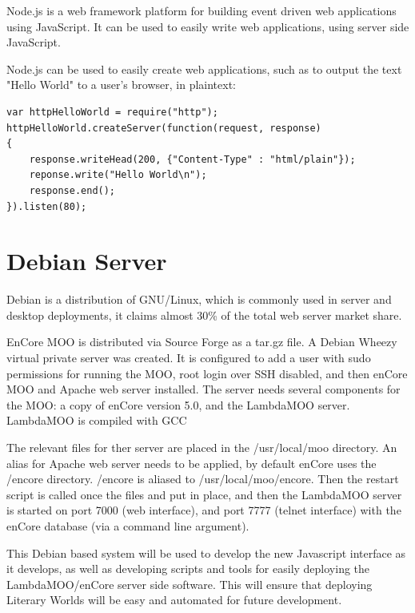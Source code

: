 \documentclass[12pt, letterpaper]{report}
\begin{document}
\par
Node.js is a web framework platform for building event driven web applications using JavaScript. It can be used to easily write web applications, using server side JavaScript.
	
\par
Node.js can be used to easily create web applications, such as to output the text "Hello World" to a user's browser, in plaintext:

\begin{lstlisting}
var httpHelloWorld = require("http");
httpHelloWorld.createServer(function(request, response)
{
    response.writeHead(200, {"Content-Type" : "html/plain"});
    reponse.write("Hello World\n");
    response.end();
}).listen(80);
\end{lstlisting}


\section{Debian Server}
\par
Debian is a distribution of GNU/Linux, which is commonly used in server and desktop deployments, it claims almost 30\% of the total web server market share.

\par 
EnCore MOO is distributed via Source Forge as a tar.gz file. A Debian Wheezy virtual private server was created. It is configured to add a user with sudo permissions for running the MOO, root login over SSH disabled, and then enCore MOO and Apache web server installed. The server needs several components for the MOO: a copy of enCore version 5.0, and the LambdaMOO server. LambdaMOO is compiled with GCC

\par
The relevant files for ther server are placed in the /usr/local/moo directory. An alias for Apache web server needs to be applied, by default enCore uses the /encore directory. /encore is aliased to /usr/local/moo/encore. Then the restart script is called once the files and put in place, and then the LambdaMOO server is started on port 7000 (web interface), and port 7777 (telnet interface) with the enCore database (via a command line argument).

\par
This Debian based system will be used to develop the new Javascript interface as it develops, as well as developing scripts and tools for easily deploying the LambdaMOO/enCore server side software. This will ensure that deploying Literary Worlds will be easy and automated for future development.
\end{document}
